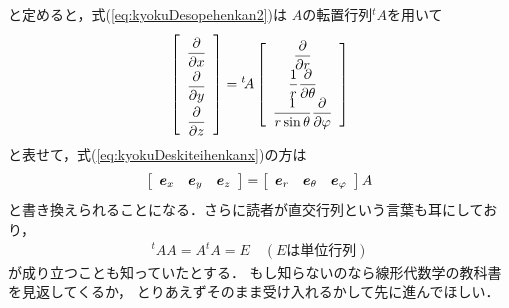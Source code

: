と定めると，式(\ref{eq:kyokuDesopehenkan2})は
$A$の転置行列${}^t \! A$を用いて
\begin{align*}
\left[
\renewcommand{\arraystretch}{2}
\begin{array}{c}
\dfrac{ \partial } {\partial x} \\
\dfrac{ \partial } {\partial y} \\
\dfrac{ \partial } {\partial z}
\end{array}
\right] = {}^t \! A 
\left[
\begin{array}{c}
\dfrac{ \partial } {\partial r} \\
\dfrac{1}{r} \dfrac{ \partial } {\partial \theta} \\
\dfrac{1}{r \sin \theta } \dfrac{ \partial } {\partial \varphi}
\end{array}
\right] 
\end{align*}
と表せて，式(\ref{eq:kyokuDeskiteihenkanx})の方は
\begin{align*}
\renewcommand{\arraystretch}{1}
\left[
\begin{array}{ccc}
\bm{e}_x & \bm{e}_y & \bm{e}_z
\end{array}
\right]
= \left[
\begin{array}{ccc}
\bm{e}_r & \bm{e}_\theta & \bm{e}_\varphi 
\end{array}
\right] A
\end{align*}
と書き換えられることになる．さらに読者が直交行列という言葉も耳にしており，
\begin{align*}
{}^t \! A A = A {}^t \! A = E \quad ( E\text{は単位行列})
\end{align*}
が成り立つことも知っていたとする．
もし知らないのなら線形代数学の教科書を見返してくるか，
とりあえずそのまま受け入れるかして先に進んでほしい．

